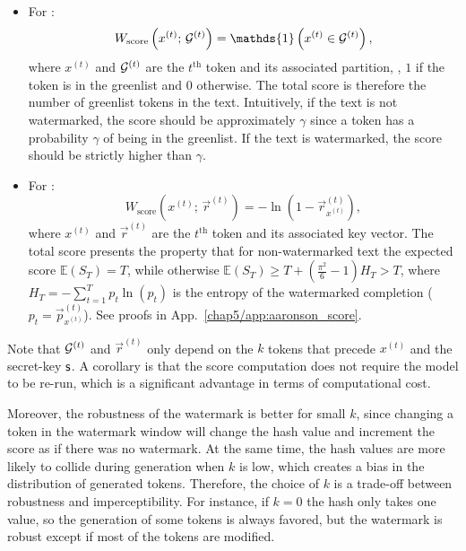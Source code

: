 \begin{itemize}
    \item For \citet{kirchenbauer2023watermark}:
    \begin{equation}
        W_{\textrm{score}} \left( x^{(t)} ;\, \G^{(t)} \right) = \mathds{1} \left(x^{(t)}\in\G^{(t)}\right),
    \end{equation}        
    where $x^{(t)}$ and $\mathcal{G}^{(t)}$ are the $t^{\textrm{th}}$ token and its associated partition, \ie, $1$ if the token is in the greenlist and $0$ otherwise.
    The total score is therefore the number of greenlist tokens in the text.
    Intuitively, if the text is not watermarked, the score should be approximately $\gamma$ since a token has a probability $\gamma$ of being in the greenlist.
    If the text is watermarked, the score should be strictly higher than $\gamma$.
    
    \item For \citet{aaronson2023watermarking}:
    \begin{equation}
        W_{\textrm{score}} \left( x^{(t)} ;\, \vec{r}^{(t)} \right) = - \ln \left(1- \vec{r}^{(t)}_{x^{(t)}} \right),
    \end{equation}
    where $x^{(t)}$ and $\vec{r}^{(t)}$ are the $t^{\textrm{th}}$ token and its associated key vector.
    The total score presents the property that for non-watermarked text the expected score $\mathbb{E}(S_T) = T$, while otherwise $\displaystyle \mathbb{E}(S_T) \geq T +  \left( \frac{\pi^2}{6} -1 \right) H_T > T $, where $H_T = - \sum_{t=1}^T p_t\ln(p_t)$ is the entropy of the watermarked completion ($p_t = \vec{p}^{(t)}_{x^{(t)}}$).
    See proofs in App.~\ref{chap5/app:aaronson_score}.
\end{itemize}
Note that $\mathcal{G}^{(t)}$ and $\vec{r}^{(t)}$ only depend on the $k$ tokens that precede $x^{(t)}$ and the secret-key $\mathsf{s}$.
A corollary is that the score computation does not require the model to be re-run, which is a significant advantage in terms of computational cost.

Moreover, the robustness of the watermark is better for small $k$, since changing a token in the watermark window will change the hash value and increment the score as if there was no watermark.
At the same time, the hash values are more likely to collide during generation when $k$ is low, which creates a bias in the distribution of generated tokens.
Therefore, the choice of $k$ is a trade-off between robustness and imperceptibility.
For instance, if $k=0$ the hash only takes one value, so the generation of some tokens is always favored, but the watermark is robust except if most of the tokens are modified.


